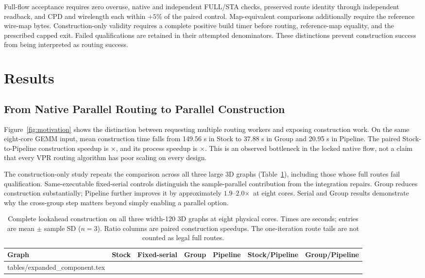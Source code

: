 \documentclass[conference,10pt,letterpaper]{IEEEtran}
\makeatletter
\newcommand{\speedup}{\ensuremath{\times}}
\newcommand{\tableinput}[1]{\@@input #1 }
\makeatother
\begin{document}
Full-flow acceptance requires zero overuse, native and independent FULL/STA checks, preserved route identity through independent readback, and CPD and wirelength each within $+5\%$ of the paired control. Map-equivalent comparisons additionally require the reference wire-map bytes. Construction-only validity requires a complete positive build timer before routing, reference-map equality, and the prescribed capped exit. Failed qualifications are retained in their attempted denominators. These distinctions prevent construction success from being interpreted as routing success.

\section{Results}
\subsection{From Native Parallel Routing to Parallel Construction}
Figure~\ref{fig:motivation} shows the distinction between requesting multiple routing workers and exposing construction work. On the same eight-core GEMM input, mean construction time falls from 149.56 s in Stock to 37.88 s in Group and 20.95 s in Pipeline. The paired Stock-to-Pipeline construction speedup is \PrimaryBuild\speedup, and its process speedup is \PrimarySpeed\speedup. This is an observed bottleneck in the locked native flow, not a claim that every VPR routing algorithm has poor scaling on every design.

The construction-only study repeats the comparison across all three large 3D graphs (Table~\ref{tab:component}), including those whose full routes fail qualification. Same-executable fixed-serial controls distinguish the sample-parallel contribution from the integration repairs. Group reduces construction substantially; Pipeline further improves it by approximately $1.9$--$2.0$\speedup\ at eight cores. Serial and Group results demonstrate why the cross-group step matters beyond simply enabling a parallel option.

\begin{table}[t]
\centering\footnotesize
\caption{Complete lookahead construction on all three width-120 3D graphs at eight physical cores. Times are seconds; entries are mean $\pm$ sample SD ($n=3$). Ratio columns are paired construction speedups. The one-iteration route tails are not counted as legal full routes.}
\label{tab:component}
\setlength{\tabcolsep}{5pt}
\begin{tabular}{lrrrrrr}
\toprule
Graph & Stock & Fixed-serial & Group & Pipeline & Stock/Pipeline & Group/Pipeline \\
\midrule
\tableinput{tables/expanded_component.tex}
\bottomrule
\end{tabular}
\end{table}
\end{document}
